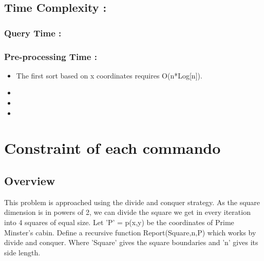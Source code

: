 \documentclass{article}
\begin{document}
\subsection{Time Complexity : }
\subsubsection{Query Time : }

\subsubsection{Pre-processing Time : }
\begin{itemize}
\item The first sort based on x coordinates requires O(n*Log[n]).
\item 
\item
\item

\end{itemize}
\section{Constraint of each commando}
\subsection{Overview}
This problem is approached using the divide and conquer strategy. As the square dimension is in powers of 2, we can divide the square we get in every iteration into 4 squares of equal size. Let 'P' = p(x,y) be the coordinates of Prime Minster's cabin. Define a recursive function Report(Square,n,P) which works by divide and conquer. Where 'Square' gives the square boundaries and 'n' gives its side length. 
\end{document}
